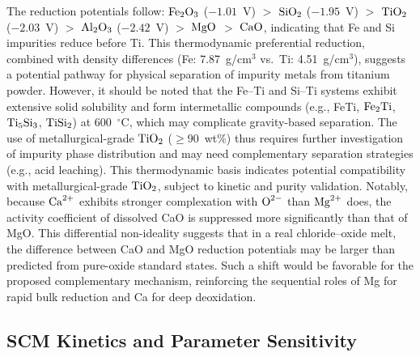 \documentclass[sn-mathphys,Numbered]{sn-jnl}
\begin{document}
The reduction potentials follow: $\ce{Fe2O3}$ ($-1.01$~V) $>$ $\ce{SiO2}$ ($-1.95$~V) $>$ $\ce{TiO2}$ ($-2.03$~V) $>$ $\ce{Al2O3}$ ($-2.42$~V) $>$ $\ce{MgO}$ $>$ $\ce{CaO}$, indicating that Fe and Si impurities reduce before Ti. This thermodynamic preferential reduction, combined with density differences (Fe: 7.87~g/cm$^3$ vs.\ Ti: 4.51~g/cm$^3$), suggests a potential pathway for physical separation of impurity metals from titanium powder. However, it should be noted that the Fe--Ti and Si--Ti systems exhibit extensive solid solubility and form intermetallic compounds (e.g., FeTi, $\ce{Fe2Ti}$, $\ce{Ti5Si3}$, $\ce{TiSi2}$) at 600~$^{\circ}$C, which may complicate gravity-based separation. The use of metallurgical-grade $\ce{TiO2}$ ($\geq$90~wt\%) thus requires further investigation of impurity phase distribution and may need complementary separation strategies (e.g., acid leaching). This thermodynamic basis indicates potential compatibility with metallurgical-grade $\ce{TiO2}$, subject to kinetic and purity validation. Notably, because $\ce{Ca^{2+}}$ exhibits stronger complexation with $\ce{O^{2-}}$ than $\ce{Mg^{2+}}$ does, the activity coefficient of dissolved CaO is suppressed more significantly than that of MgO. This differential non-ideality suggests that in a real chloride--oxide melt, the difference between CaO and MgO reduction potentials may be larger than predicted from pure-oxide standard states. Such a shift would be favorable for the proposed complementary mechanism, reinforcing the sequential roles of Mg for rapid bulk reduction and Ca for deep deoxidation.

\subsection{SCM Kinetics and Parameter Sensitivity}
\label{subsec:scm}
\end{document}
